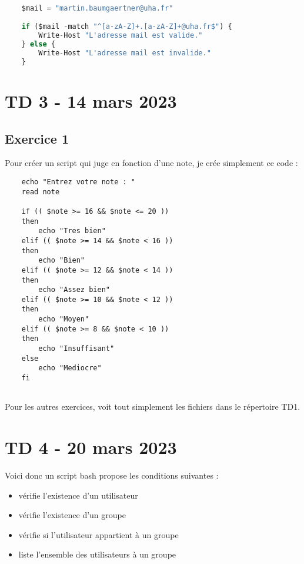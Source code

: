\documentclass[12pt, a4paper]{article}
\begin{document}
\begin{lstlisting}[language=Python]
    
    $mail = "martin.baumgaertner@uha.fr"

    if ($mail -match "^[a-zA-Z]+.[a-zA-Z]+@uha.fr$") {
        Write-Host "L'adresse mail est valide."
    } else {
        Write-Host "L'adresse mail est invalide."
    }

\end{lstlisting}

\newpage
\section{TD 3 - 14 mars 2023}

\subsection{Exercice 1}
Pour créer un script qui juge en fonction d'une note, je crée simplement 
ce code : 
\begin{lstlisting}
    echo "Entrez votre note : "
    read note

    if (( $note >= 16 && $note <= 20 ))
    then
        echo "Tres bien"
    elif (( $note >= 14 && $note < 16 ))
    then
        echo "Bien"
    elif (( $note >= 12 && $note < 14 ))
    then
        echo "Assez bien"
    elif (( $note >= 10 && $note < 12 ))
    then
        echo "Moyen"
    elif (( $note >= 8 && $note < 10 ))
    then
        echo "Insuffisant"
    else
        echo "Mediocre"
    fi
    
\end{lstlisting}

Pour les autres exercices, voit tout simplement les fichiers dans le répertoire 
TD1. 

\newpage
\section{TD 4 - 20 mars 2023}
Voici donc un script bash propose les conditions suivantes : 
\begin{itemize}
    \item vérifie l’existence d’un utilisateur
    \item vérifie l’existence d’un groupe
    \item vérifie si l'utilisateur appartient à un groupe
    \item liste l'ensemble des utilisateurs à un groupe
\end{itemize}
\end{document}
